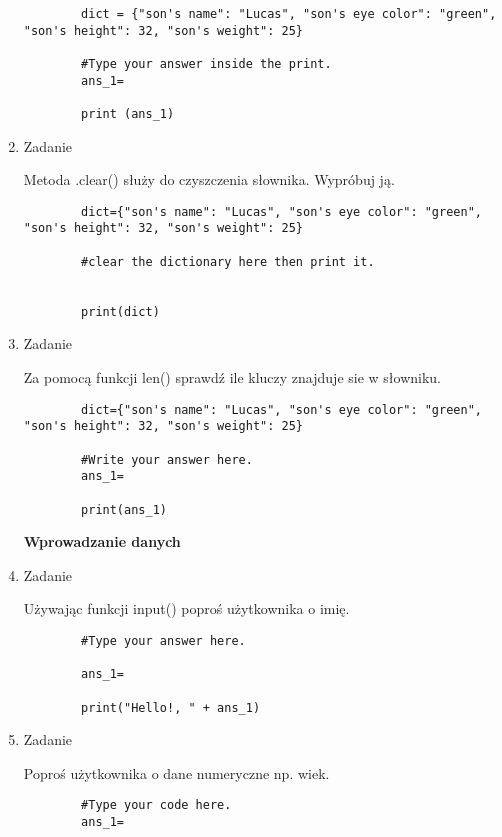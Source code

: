 \documentclass[11pt]{article}
\begin{document}
\begin{enumerate}
 	\begin{lstlisting}
 		dict = {"son's name": "Lucas", "son's eye color": "green", "son's height": 32, "son's weight": 25}
 		
 		#Type your answer inside the print.
 		ans_1=
 		
 		print (ans_1)
 	\end{lstlisting}
 
 \item 
 \begin{Large}
 	Zadanie
 \end{Large}
	\par
	Metoda .clear() służy do czyszczenia słownika. Wypróbuj ją.
	\begin{lstlisting}
		dict={"son's name": "Lucas", "son's eye color": "green", "son's height": 32, "son's weight": 25}
		
		#clear the dictionary here then print it.
		
		
		print(dict)
	\end{lstlisting}
	
	\item 
	\begin{Large}
		Zadanie
	\end{Large}
	\par
	 Za pomocą funkcji len() sprawdź ile kluczy znajduje sie w słowniku.
	 \begin{lstlisting}
	 	dict={"son's name": "Lucas", "son's eye color": "green", "son's height": 32, "son's weight": 25}
	 	
	 	#Write your answer here.
	 	ans_1=
	 	
	 	print(ans_1)
	 \end{lstlisting}
 
 \medskip
 \begin{Large}
 	\textbf{Wprowadzanie danych}
 \end{Large}
	\item 
	\begin{Large}
		Zadanie
	\end{Large}
	\par
	Używając funkcji input() poproś użytkownika o imię.
	
	\begin{lstlisting}
		#Type your answer here.
		
		ans_1=
		
		print("Hello!, " + ans_1)
	\end{lstlisting}

	\item 
	\begin{Large}
		Zadanie
	\end{Large}
	\par
	Poproś użytkownika o dane numeryczne np. wiek.
	\begin{lstlisting}
		#Type your code here.
		ans_1=
		

\end{lstlisting}
\end{enumerate}
\end{document}
